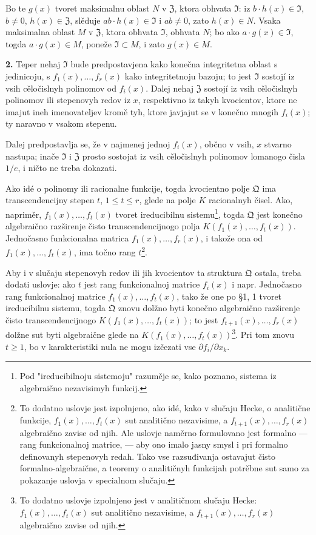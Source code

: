 \documentclass[11pt]{article}
\begin{document}
Bo te \(g(x)\) tvoret maksimalnu oblast \(N\) v \(\mathfrak{Z}\), ktora obhvata \(\mathfrak{I}\): iz \(b\cdot h(x)\in\mathfrak{I}\), \(b\ne0\), \(h(x)\in\mathfrak{Z}\), slěduje \(ab\cdot h(x)\in\mathfrak{I}\) i \(ab\ne0\), zato \(h(x)\in N\). Vsaka maksimalna oblast \(M\) v \(\mathfrak{Z}\), ktora obhvata \(\mathfrak{I}\), obhvata \(N\); bo ako \(a\cdot g(x)\in\mathfrak{I}\), togda \(a\cdot g(x)\in M\), poneže \(\mathfrak{I}\subset M\), i zato \(g(x)\in M\).

\medskip\noindent\textbf{2.}
Teper nehaj \(\mathfrak{I}\) bude predpostavjena kako konečna integritetna oblast s jedinicoju, s \(f_1(x),\ldots,f_r(x)\) kako integritetnoju bazoju; to jest \(\mathfrak{I}\) sostojí iz vsih cěločislnyh polinomov od \(f_i(x)\). Dalej nehaj \(\mathfrak{Z}\) sostojí iz vsih cěločislnyh polinomov ili stepenovyh redov iz \(x\), respektivno iz takyh kvocientov, ktore ne imajut ineh imenovateljev kromě tyh, ktore javjajut se v konečno mnogih \(f_i(x)\); ty naravno v vsakom stepenu.

Dalej predpostavlja se, že v najmenej jednoj \(f_i(x)\), občno v vsih, \(x\) stvarno nastupa; inače \(\mathfrak{I}\) i \(\mathfrak{Z}\) prosto sostojat iz vsih cěločislnyh polinomov lomanogo čisla \(1/e\), i ničto ne treba dokazati.

Ako idé o polinomy ili racionalne funkcije, togda kvocientno polje \(\mathfrak{Q}\) ima transcendencijny stepen \(t\), \(1\le t\le r\), glede na polje \(K\) racionalnyh čisel. Ako, napriměr, \(f_1(x),\ldots,f_t(x)\) tvoret ireducibilnu sistemu\footnote{Pod "ireducibilnoju sistemoju" razuměje se, kako poznano, sistema iz algebraično nezavisimyh funkcij.}, togda \(\mathfrak{Q}\) jest konečno algebraično razširenje čisto transcendencijnogo polja \(K(f_1(x),\ldots,f_t(x))\). Jednočasno funkcionalna matrica \(f_1(x),\ldots,f_r(x)\), i takože ona od \(f_1(x),\ldots,f_t(x)\), ima točno rang \(t\)\footnote{To dodatno uslovje jest izpolnjeno, ako idé, kako v slučaju Hecke, o analitične funkcije, \(f_1(x),\ldots,f_t(x)\) sut analitično nezavisime, a \(f_{t+1}(x),\ldots,f_r(x)\) algebraično zavise od njih. Ale uslovje naměrno formulovano jest formalno --- rang funkcionalnoj matrice, --- aby ono imalo jasny smysl i pri formalno definovanyh stepenovyh redah. Tako vse razsuđivanja ostavajut čisto formalno-algebraične, a teoremy o analitičnyh funkcijah potrěbne sut samo za pokazanje uslovja v specialnom slučaju.}.

Aby i v slučaju stepenovyh redov ili jih kvocientov ta struktura \(\mathfrak{Q}\) ostala, treba dodati uslovje: ako \(t\) jest rang funkcionalnoj matrice \(f_i(x)\) i napr. Jednočasno rang funkcionalnoj matrice \(f_1(x),\ldots,f_t(x)\), tako že one po §1, 1 tvoret ireducibilnu sistemu, togda \(\mathfrak{Q}\) znovu dolžno byti konečno algebraično razširenje čisto transcendencijnogo \(K(f_1(x),\ldots,f_t(x))\); to jest \(f_{t+1}(x),\ldots,f_r(x)\) dolžne sut byti algebraične glede na \(K(f_1(x),\ldots,f_t(x))\)\footnote{To dodatno uslovje izpolnjeno jest v analitičnom slučaju Hecke: \(f_1(x),\ldots,f_t(x)\) sut analitično nezavisime, a \(f_{t+1}(x),\ldots,f_r(x)\) algebraično zavise od njih.}. Pri tom znovu \(t\ge1\), bo v karakteristiki nula ne mogu izčezati vse \(\partial f_i/\partial x_k\).
\end{document}
